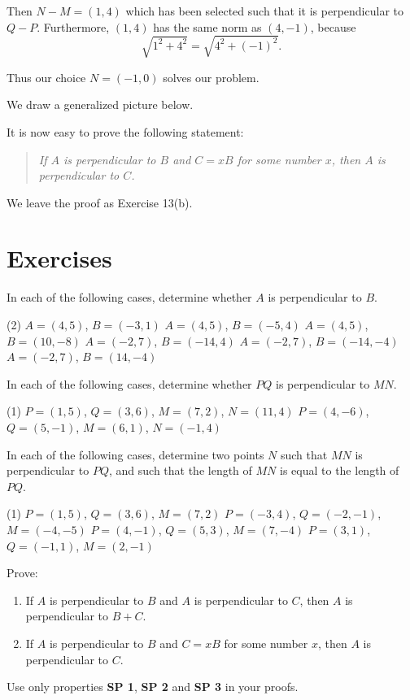 \documentclass[12pt]{book} %
\begin{document}
\begin{ExerciseList}
Then $N-M=(1,4)$ which has been selected such that it is perpendicular to $Q-P$. Furthermore, $(1,4)$ has the same norm as $(4,-1)$, because
\[
\sqrt{1^2+4^2}=\sqrt{4^2+(-1)^2}.
\]

Thus our choice $N=(-1,0)$ solves our problem.

We draw a generalized picture below.


It is now easy to prove the following statement:

\begin{quote}
\textit{If $A$ is perpendicular to $B$ and $C=xB$ for some number $x$, then $A$ is perpendicular to $C$.}
\end{quote}

We leave the proof as Exercise 13(b).

\section*{Exercises}

\setcounter{Exercise}{0}
\begin{ExerciseList}
\Exercise In each of the following cases, determine whether $A$ is perpendicular to $B$.
\begin{tasks}(2)
\task[(1)] $A=(4,5)$, $B=(-3,1)$
\task[(2)] $A=(4,5)$, $B=(-5,4)$
\task[(3)] $A=(4,5)$, $B=(10,-8)$
\task[(4)] $A=(-2,7)$, $B=(-14,4)$
\task[(5)] $A=(-2,7)$, $B=(-14,-4)$
\task[(6)] $A=(-2,7)$, $B=(14,-4)$
\end{tasks}

\Exercise In each of the following cases, determine whether $PQ$ is perpendicular to $MN$.
\begin{tasks}(1)
\task[(7)] $P=(1,5)$, $Q=(3,6)$, $M=(7,2)$, $N=(11,4)$
\task[(8)] $P=(4,-6)$, $Q=(5,-1)$, $M=(6,1)$, $N=(-1,4)$
\end{tasks}

\Exercise In each of the following cases, determine two points $N$ such that $MN$ is perpendicular to $PQ$, and such that the length of $MN$ is equal to the length of $PQ$.
\begin{tasks}(1)
\task[(9)] $P=(1,5)$, $Q=(3,6)$, $M=(7,2)$
\task[(10)] $P=(-3,4)$, $Q=(-2,-1)$, $M=(-4,-5)$
\task[(11)] $P=(4,-1)$, $Q=(5,3)$, $M=(7,-4)$
\task[(12)] $P=(3,1)$, $Q=(-1,1)$, $M=(2,-1)$
\end{tasks}

\Exercise Prove:
\begin{enumerate}
\item[(a)] If $A$ is perpendicular to $B$ and $A$ is perpendicular to $C$, then $A$ is perpendicular to $B+C$.
\item[(b)] If $A$ is perpendicular to $B$ and $C=xB$ for some number $x$, then $A$ is perpendicular to $C$.
\end{enumerate}
Use only properties \textbf{SP 1}, \textbf{SP 2} and \textbf{SP 3} in your proofs.


\end{ExerciseList}
\end{ExerciseList}
\end{document}
